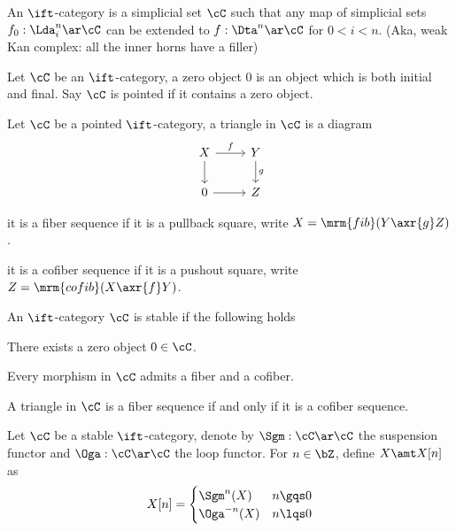 \documentclass[a4paper, twoside]{article}
\begin{document}
\begin{dfn}[0.0.0.1]
    An $\ift$-category is a simplicial set $\cC$ such that any map of simplicial sets $f_{0}:\Lda_{i}^{n}\ar\cC$ can be extended to $f:\Dta^{n}\ar\cC$ for $0<i<n$. (Aka, weak Kan complex: all the inner horns have a filler)
\end{dfn}

\begin{dfn}[1.1.1.1]
    Let $\cC$ be an $\ift$-category, a zero object $0$ is an object which is both initial and final. Say $\cC$ is pointed if it contains a zero object.
\end{dfn}

\begin{dfn}[1.1.1.4]
    Let $\cC$ be a pointed $\ift$-category, a triangle in $\cC$ is a diagram
    \[
        \begin{tikzcd}
            X\ar[r, "f"]\ar[d] & Y\ar[d, "g"] \\
            0 \ar[r] & Z
        \end{tikzcd}
    \]
    \begin{itm}
        \item it is a fiber sequence if it is a pullback square, write $X=\mrm{fib}(Y\axr{g}Z)$.
        \item it is a cofiber sequence if it is a pushout square, write $Z=\mrm{cofib}(X\axr{f}Y)$.
    \end{itm}
\end{dfn}

\begin{dfn}[1.1.1.9]
    An $\ift$-category $\cC$ is stable if the following holds
    \begin{enr}[label=(\arabic*)]
        \item There exists a zero object $0\in\cC$.
        \item Every morphism in $\cC$ admits a fiber and a cofiber.
        \item A triangle in $\cC$ is a fiber sequence if and only if it is a cofiber sequence.
    \end{enr}

\end{dfn}


\begin{dfn}[1.1.2.7]
    Let $\cC$ be a stable $\ift$-category, denote by $\Sgm:\cC\ar\cC$ the suspension functor and $\Oga:\cC\ar\cC$ the loop functor. For $n\in\bZ$, define $X\amt X[n]$ as
        \[
            X[n]=\begin{cases}
              \Sgm^{n}(X) & n\gqs0 \\
              \Oga^{-n}(X) & n\lqs0
            \end{cases}
        \]
\end{dfn}
\end{document}
